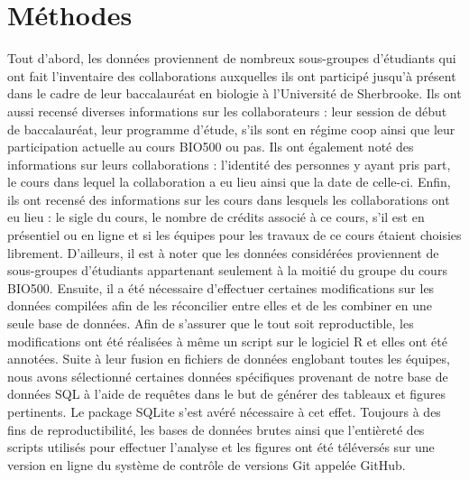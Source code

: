 \documentclass{article}
\begin{document}
\section{Méthodes} Tout d'abord, les données proviennent de nombreux sous-groupes d'étudiants qui ont fait l'inventaire des collaborations auxquelles ils ont participé jusqu'à présent dans le cadre de leur baccalauréat en biologie à l'Université de Sherbrooke. Ils ont aussi recensé diverses informations sur les collaborateurs : leur session de début de baccalauréat, leur programme d'étude, s'ils sont en régime coop ainsi que leur participation actuelle au cours BIO500 ou pas. Ils ont également noté des informations sur leurs collaborations : l'identité des personnes y ayant pris part, le cours dans lequel la collaboration a eu lieu ainsi que la date de celle-ci. Enfin, ils ont recensé des informations sur les cours dans lesquels les collaborations ont eu lieu : le sigle du cours, le nombre de crédits associé à ce cours, s'il est en présentiel ou en ligne et si les équipes pour les travaux de ce cours étaient choisies librement. D'ailleurs, il est à noter que les données considérées proviennent de sous-groupes d'étudiants appartenant seulement à la moitié du groupe du cours BIO500. Ensuite, il a été nécessaire d'effectuer certaines modifications sur les données compilées afin de les réconcilier entre elles et de les combiner en une seule base de données. Afin de s'assurer que le tout soit reproductible, les modifications ont été réalisées à même un script sur le logiciel R et elles ont été annotées. Suite à leur fusion en fichiers de données englobant toutes les équipes, nous avons sélectionné certaines données spécifiques provenant de notre base de données SQL à l'aide de requêtes dans le but de générer des tableaux et figures pertinents. Le package SQLite s'est avéré nécessaire à cet effet. Toujours à des fins de reproductibilité, les bases de données brutes ainsi que l'entièreté des scripts utilisés pour effectuer l'analyse et les figures ont été téléversés sur une version en ligne du système de contrôle de versions Git appelée GitHub.
\end{document}
